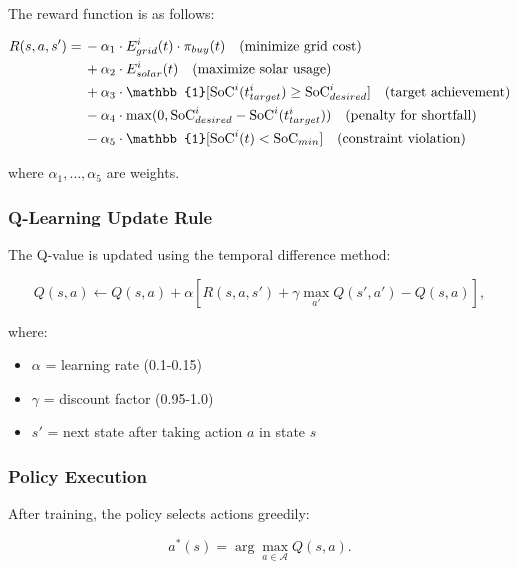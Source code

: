 The reward function is as follows:

\begin{align}
R(s,a,s') = &\, -\alpha_1 \cdot E_{grid}^i(t) \cdot \pi_{buy}(t) \quad \text{(minimize grid cost)} \nonumber \\
            &\, +\alpha_2 \cdot E_{solar}^i(t) \quad \text{(maximize solar usage)} \nonumber \\
            &\, +\alpha_3 \cdot \mathbb{1}[\soc^i(t_{target}^i) \geq \soc_{desired}^i] \quad \text{(target achievement)} \nonumber \\
            &\, -\alpha_4 \cdot \max(0, \soc_{desired}^i - \soc^i(t_{target}^i)) \quad \text{(penalty for shortfall)} \nonumber \\
            &\, -\alpha_5 \cdot \mathbb{1}[\soc^i(t) < \soc_{min}] \quad \text{(constraint violation)}
\end{align}

where $\alpha_1, \ldots, \alpha_5$ are weights.

\subsubsection{Q-Learning Update Rule}

The Q-value is updated using the temporal difference method:

\begin{equation}
Q(s,a) \leftarrow Q(s,a) + \alpha \left[ R(s,a,s') + \gamma \max_{a'} Q(s',a') - Q(s,a) \right],
\end{equation}

where:
\begin{itemize}
    \item $\alpha$ = learning rate (0.1-0.15)
    \item $\gamma$ = discount factor (0.95-1.0)
    \item $s'$ = next state after taking action $a$ in state $s$
\end{itemize}

\subsubsection{Policy Execution}

After training, the policy selects actions greedily:

\begin{equation}
a^*(s) = \arg\max_{a \in \mathcal{A}} Q(s,a).
\end{equation}

